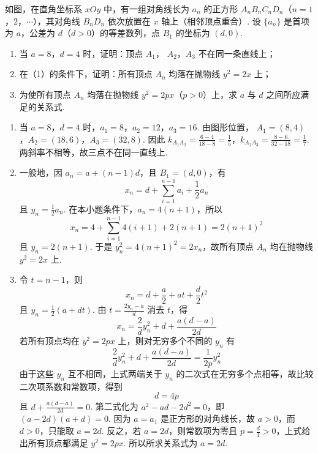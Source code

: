 \begin{problem}

如图，在直角坐标系 \(xOy\) 中，有一组对角线长为 \( a_{n} \) 的正方形 \( A_{n}B_{n}C_{n}D_{n} \)（\(n=1\)，\(2\)，\(\cdots\)），其对角线 \( B_n D_n \) 依次放置在 \( x \) 轴上（相邻顶点重合）. 设 \( \{a_n\} \) 是首项为 \( a \)，公差为 \( d \)（\(d > 0\)）的等差数列，点 \(B_1\) 的坐标为 \( (d, 0) \).

\begin{enumerate}
\item 当 \(a = 8\)，\(d = 4\) 时，证明：顶点 \(A_{1}\)， \(A_{2}\)，\(A_{3}\) 不在同一条直线上；
\item 在（1）的条件下，证明：所有顶点 \( A_{n} \) 均落在抛物线 \( y^{2}=2x \) 上；
\item 为使所有顶点 \( A_{n} \) 均落在抛物线 \( y^{2}=2px \)（\(p>0\)）上，求 \(a\) 与 \(d\) 之间所应满足的关系式.
\end{enumerate}

\end{problem}

\begin{solution}
\begin{enumerate}
\item 当 \(a=8\)，\(d=4\) 时，\(a_1=8\)，\(a_2=12\)，\(a_3=16\). 由图形位置，
\(A_1=(8,4)\)，\(A_2=(18,6)\)，\(A_3=(32,8)\).
因此 \(k_{A_1A_2}=\frac{6-4}{18-8}=\frac15\)，\(k_{A_2A_3}=\frac{8-6}{32-18}=\frac17\).
两斜率不相等，故三点不在同一直线上.
\item 一般地，因 \(a_n=a+(n-1)d\)，且 \(B_1=(d,0)\)，有
\[
x_n=d+\sum_{i=1}^{n-1}a_i+\frac12a_n
\]
且 \(y_n=\frac12a_n\).
在本小题条件下，\(a_n=4(n+1)\)，所以
\[
x_n=4+\sum_{i=1}^{n-1}4(i+1)+2(n+1)=2(n+1)^2
\]
且 \(y_n=2(n+1)\).
于是 \(y_n^2=4(n+1)^2=2x_n\)，故所有顶点 \(A_n\) 均在抛物线 \(y^2=2x\) 上.
\item 令 \(t=n-1\)，则
\[
x_n=d+\frac a2+at+\frac d2t^2
\]
且 \(y_n=\frac12(a+dt)\).
由 \(t=\frac{2y_n-a}{d}\) 消去 \(t\)，得
\[
x_n=\frac{2}{d}y_n^2+d+\frac{a(d-a)}{2d}
\]
若所有顶点均在 \(y^2=2px\) 上，则对无穷多个不同的 \(y_n\) 有
\[
\frac{2}{d}y_n^2+d+\frac{a(d-a)}{2d}=\frac{1}{2p}y_n^2
\]
由于这些 \(y_n\) 互不相同，上式两端关于 \(y_n\) 的二次式在无穷多个点相等，故比较二次项系数和常数项，得到
\[
d=4p
\]
且 \(d+\frac{a(d-a)}{2d}=0\).
第二式化为 \(a^2-ad-2d^2=0\)，即 \((a-2d)(a+d)=0\). 因为 \(a=a_1\) 是正方形的对角线长，故 \(a>0\)，而 \(d>0\)，只能取 \(a=2d\). 反之，若 \(a=2d\)，则常数项为零且 \(p=\frac d4>0\)，上式给出所有顶点都满足 \(y^2=2px\). 所以所求关系式为 \(a=2d\).
\end{enumerate}
\end{solution}

